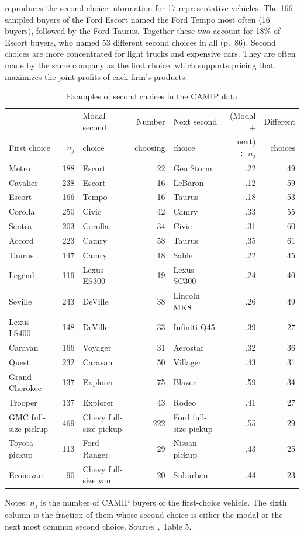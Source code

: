  reproduces the second-choice information for 17 representative vehicles. The 166
sampled buyers of the Ford Escort named the Ford Tempo most often (16 buyers), followed by the Ford Taurus.
Together these two account for 18\% of Escort buyers, who named 53 different second choices in all (p.~86).
Second choices are more concentrated for light trucks and expensive cars. They are often made by the same
company as the first choice, which supports pricing that maximizes the joint profits of each firm's products.

\begin{table}[htbp]
\centering
\caption{Examples of second choices in the CAMIP data}
\label{tab:08-blp04-second}
\footnotesize
\setlength{\tabcolsep}{4pt}
\begin{tabular}{@{}lrlrlrr@{}}
\toprule
 & & Modal second & Number & Next second & (Modal $+$ & Different \\
First choice & $n_j$ & choice & choosing & choice & next)$\,\div\, n_j$ & choices \\
\midrule
Metro & 188 & Escort & 22 & Geo Storm & .22 & 49 \\
Cavalier & 238 & Escort & 16 & LeBaron & .12 & 59 \\
Escort & 166 & Tempo & 16 & Taurus & .18 & 53 \\
Corolla & 250 & Civic & 42 & Camry & .33 & 55 \\
Sentra & 203 & Corolla & 34 & Civic & .31 & 60 \\
Accord & 223 & Camry & 58 & Taurus & .35 & 61 \\
Taurus & 147 & Camry & 18 & Sable & .22 & 45 \\
Legend & 119 & Lexus ES300 & 19 & Lexus SC300 & .24 & 40 \\
Seville & 243 & DeVille & 38 & Lincoln MK8 & .26 & 49 \\
Lexus LS400 & 148 & DeVille & 33 & Infiniti Q45 & .39 & 27 \\
Caravan & 166 & Voyager & 31 & Aerostar & .32 & 36 \\
Quest & 232 & Caravan & 50 & Villager & .43 & 31 \\
Grand Cherokee & 137 & Explorer & 75 & Blazer & .59 & 34 \\
Trooper & 137 & Explorer & 43 & Rodeo & .41 & 27 \\
GMC full-size pickup & 469 & Chevy full-size pickup & 222 & Ford full-size pickup & .55 & 29 \\
Toyota pickup & 113 & Ford Ranger & 29 & Nissan pickup & .43 & 25 \\
Econovan & 90 & Chevy full-size van & 20 & Suburban & .44 & 23 \\
\bottomrule
\end{tabular}

\smallskip
\begin{minipage}{0.92\linewidth}
\footnotesize Notes: $n_j$ is the number of CAMIP buyers of the first-choice vehicle. The sixth column is the
fraction of them whose second choice is either the modal or the next most common second choice. Source:
\citet{BerryLevinsohnPakes2004}, Table 5.
\end{minipage}
\end{table}

